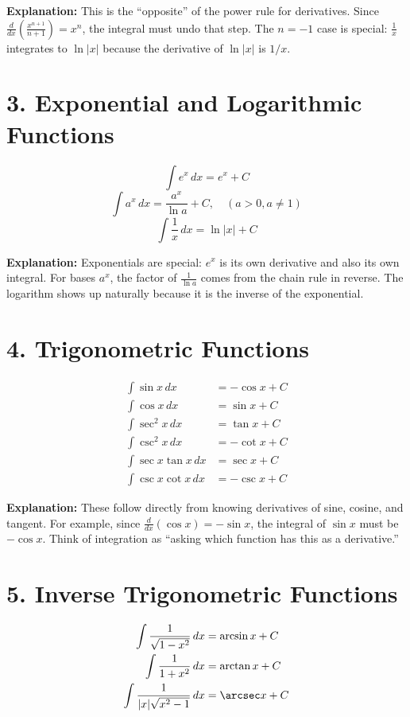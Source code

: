 \documentclass[12pt]{article}
\begin{document}
\textbf{Explanation:} This is the ``opposite'' of the power rule for derivatives. Since $\frac{d}{dx}\left( \frac{x^{n+1}}{n+1}\right) = x^n$, the integral must undo that step. The $n=-1$ case is special: $\frac{1}{x}$ integrates to $\ln|x|$ because the derivative of $\ln|x|$ is $1/x$. 

\section*{3. Exponential and Logarithmic Functions}

\[
\int e^x \, dx = e^x + C
\]
\[
\int a^x \, dx = \frac{a^x}{\ln a} + C, \quad (a>0, a \neq 1)
\]
\[
\int \frac{1}{x} \, dx = \ln|x| + C
\]

\textbf{Explanation:} Exponentials are special: $e^x$ is its own derivative and also its own integral. For bases $a^x$, the factor of $\frac{1}{\ln a}$ comes from the chain rule in reverse. The logarithm shows up naturally because it is the inverse of the exponential. 

\section*{4. Trigonometric Functions}

\begin{align*}
\int \sin x \, dx &= -\cos x + C \\
\int \cos x \, dx &= \sin x + C \\
\int \sec^2 x \, dx &= \tan x + C \\
\int \csc^2 x \, dx &= -\cot x + C \\
\int \sec x \tan x \, dx &= \sec x + C \\
\int \csc x \cot x \, dx &= -\csc x + C
\end{align*}

\textbf{Explanation:} These follow directly from knowing derivatives of sine, cosine, and tangent. For example, since $\frac{d}{dx}(\cos x) = -\sin x$, the integral of $\sin x$ must be $-\cos x$. Think of integration as ``asking which function has this as a derivative.'' 

\section*{5. Inverse Trigonometric Functions}

\begin{align*}
\int \frac{1}{\sqrt{1 - x^2}} \, dx &= \arcsin x + C \\
\int \frac{1}{1 + x^2} \, dx &= \arctan x + C \\
\int \frac{1}{|x|\sqrt{x^2 - 1}} \, dx &= \arcsec x + C
\end{align*}
\end{document}
